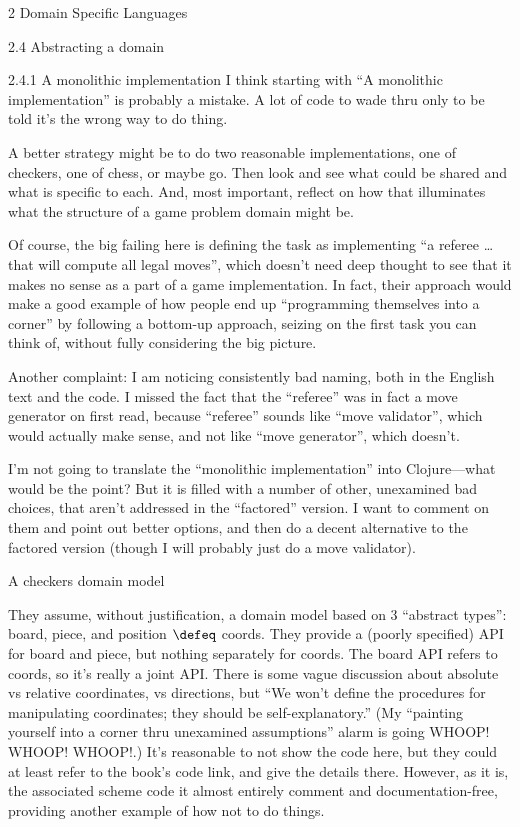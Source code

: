 \documentclass[12pt]{PalisadesLakesBook}
\begin{document}
\begin{plSection}{}
\begin{plSection}{2 Domain Specific Languages}
\begin{plSection}{2.4 Abstracting a domain}
\begin{plSection}{2.4.1 A monolithic implementation}
I think starting with ``A monolithic implementation'' 
is probably a mistake.
A lot of code to wade thru only to be told it's the wrong way
to do thing.

A better strategy might be to do two reasonable implementations,
one of checkers, one of chess, or maybe go.
Then look and see what could be shared and 
what is specific to each.
And, most important, reflect on how that illuminates 
what the structure of a game problem domain might be.

Of course, the big failing here is defining the task as 
implementing
``a referee {\ldots} that will compute all legal moves'',
which doesn't need deep thought to see that it makes no sense
as a part of a game implementation.
In fact, their approach would make a good example of how
people end up ``programming themselves into a corner''
by following a bottom-up approach,
seizing on the first task you can think of, 
without fully considering the big picture.

Another complaint: I am noticing consistently bad naming,
both in the English text and the code.
I missed the fact that the ``referee'' was in fact a move
generator on first read, because ``referee'' sounds
like ``move validator'', which would actually make sense,
and not like ``move generator'', which doesn't.

I'm not going to translate the ``monolithic implementation''
into Clojure---what would be the point?
But it is filled with a number of other, unexamined
bad choices, that aren't
addressed in the ``factored'' version.
I want to comment on them and point out better options,
and then do a decent alternative to the factored version
(though I will probably just do a move validator).

\begin{plSection}{A checkers domain model}

They assume, without justification, a domain model based
on 3 ``abstract types'': 
{\schemeFont board}, {\schemeFont piece},
and position $\defeq$ {\schemeFont coords}.
They provide a (poorly specified) API for 
{\schemeFont board} and {\schemeFont piece},
but nothing separately for {\schemeFont coords}.
The {\schemeFont board} API refers to {\schemeFont coords},
so it's really a joint API.
There is some vague discussion about 
absolute vs relative coordinates,
vs directions, but
``We won't define the procedures for manipulating coordinates;
they should be self-explanatory.''
(My ``painting yourself into a corner thru unexamined 
assumptions'' alarm is going 
WHOOP! WHOOP! WHOOP!.)
It's reasonable to not show the code here,
but they could at least refer to the book's code link,
and give the details there.
However, as it is, the associated scheme code it almost entirely
comment and documentation-free, providing another example
of how not to do things.


\end{plSection}
\end{plSection}
\end{plSection}
\end{plSection}
\end{plSection}
\end{document}
